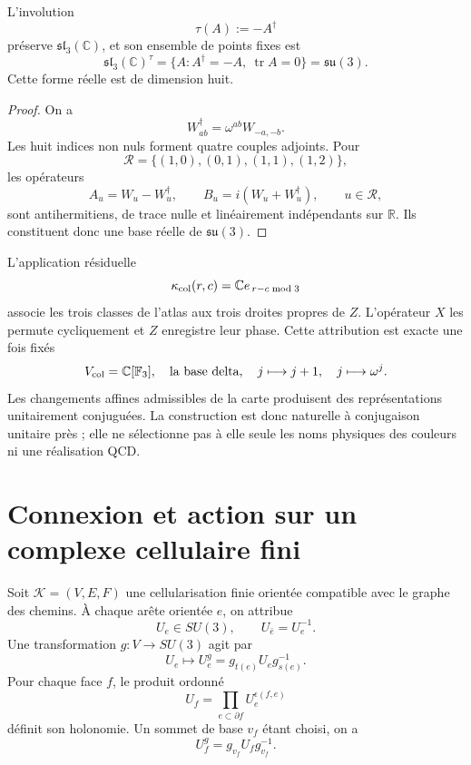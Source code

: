 \begin{corollary}
\label{cor:su3-color-qutrit}
L'involution
\[
 \tau(A):=-A^\dagger
\]
préserve \(\mathfrak{sl}_3(\mathbb C)\), et son ensemble de points fixes est
\[
 \mathfrak{sl}_3(\mathbb C)^\tau
 =\{A:A^\dagger=-A,\ \operatorname{tr}A=0\}
 =\mathfrak{su}(3).
\]
Cette forme réelle est de dimension huit.
\end{corollary}

\begin{proof}
On a
\[
 W_{ab}^{\dagger}=\omega^{ab}W_{-a,-b}.
\]
Les huit indices non nuls forment quatre couples adjoints. Pour
\[
 \mathcal R=\{(1,0),(0,1),(1,1),(1,2)\},
\]
les opérateurs
\[
 A_u=W_u-W_u^\dagger,
 \qquad
 B_u=i(W_u+W_u^\dagger),
 \qquad u\in\mathcal R,
\]
sont antihermitiens, de trace nulle et linéairement indépendants sur
\(\mathbb R\). Ils constituent donc une base réelle de
\(\mathfrak{su}(3)\).
\end{proof}

L'application résiduelle
\[
 \kappa_{\rm col}(r,c)
 =\mathbb C e_{\,r-c\bmod3}
\]
associe les trois classes de l'atlas aux trois droites propres de \(Z\).
L'opérateur \(X\) les permute cycliquement et \(Z\) enregistre leur phase. Cette
attribution est exacte une fois fixés
\[
 V_{\rm col}=\mathbb C[\mathbb F_3],
 \quad
 \text{la base delta},
 \quad
 j\longmapsto j+1,
 \quad
 j\longmapsto\omega^j.
\]
Les changements affines admissibles de la carte produisent des représentations
unitairement conjuguées. La construction est donc naturelle à
conjugaison unitaire près ; elle ne sélectionne pas à elle seule les noms physiques des
couleurs ni une réalisation QCD.

\section{Connexion et action sur un complexe cellulaire fini}
\label{sec:gauge-finito-color}

\begin{construction}
\label{cons:gauge-finito-color}
Soit \(\mathcal K=(V,E,F)\) une cellularisation finie orientée compatible avec
le graphe des chemins. À chaque arête orientée \(e\), on attribue
\[
 U_e\in SU(3),
 \qquad
 U_{\bar e}=U_e^{-1}.
\]
Une transformation \(g:V\to SU(3)\) agit par
\[
 U_e\longmapsto U_e^g
 =g_{t(e)}U_eg_{s(e)}^{-1}.
\]
Pour chaque face \(f\), le produit ordonné
\[
 U_f=\prod_{e\subset\partial f}U_e^{\epsilon(f,e)}
\]
définit son holonomie. Un sommet de base \(v_f\) étant choisi, on a
\[
 U_f^g=g_{v_f}U_fg_{v_f}^{-1}.
\]
\end{construction}


